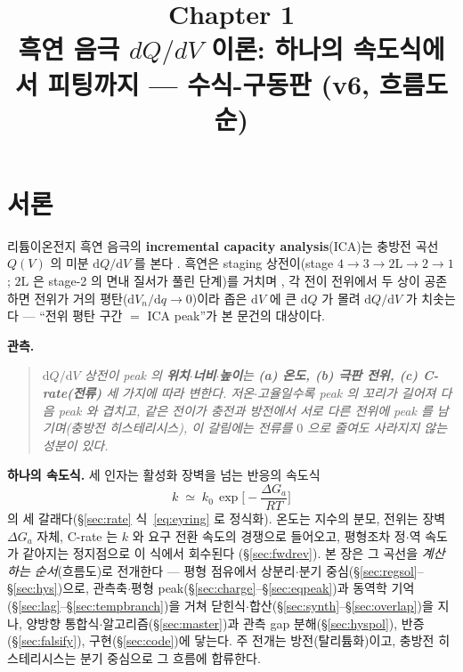 \documentclass[11pt,a4paper]{article}
\title{\textbf{\LARGE Chapter 1}\\[0.35em]\Large 흑연 음극 $dQ/dV$ 이론: 하나의 속도식에서 피팅까지 — 수식-구동판 (v6, 흐름도 순)}
\author{}
\date{}
\newcommand{\dd}{\mathrm{d}}
\begin{document}
\maketitle

\section*{서론}
리튬이온전지 흑연 음극의 \textbf{incremental capacity analysis}(ICA)는 충방전 곡선 $Q(V)$ 의 미분
$\dd Q/\dd V$ 를 본다 \cite{bloom2005,dubarry2012}. 흑연은 staging 상전이(stage
$4\!\to\!3\!\to\!2\mathrm L\!\to\!2\!\to\!1$; $2\mathrm L$ 은 stage-2 의 면내 질서가 풀린 단계)를 거치며
\cite{dahn1991,ohzuku1993,funabiki1999}, 각 전이 전위에서 두 상이 공존하면 전위가 거의 평탄($\dd V_n/\dd q\to0$)이라
좁은 $\dd V$ 에 큰 $\dd Q$ 가 몰려 $\dd Q/\dd V$ 가 치솟는다 — ``전위 평탄 구간 $=$ ICA peak''가 본 문건의 대상이다.

\textbf{관측.}
\begin{quote}\itshape
$\dd Q/\dd V$ 상전이 peak 의 \textbf{위치$\cdot$너비$\cdot$높이}는 \textbf{(a) 온도, (b) 극판 전위, (c) C-rate(전류)}
세 가지에 따라 변한다. 저온$\cdot$고율일수록 peak 의 꼬리가 길어져 다음 peak 와 겹치고, 같은 전이가 충전과 방전에서 서로 다른
전위에 peak 를 남기며(충방전 히스테리시스), 이 갈림에는 전류를 $0$ 으로 줄여도 사라지지 않는 성분이 있다.
\end{quote}

\textbf{하나의 속도식.} 세 인자는 활성화 장벽을 넘는 반응의 속도식
\begin{equation*}
k\;\simeq\;k_0\,\exp\!\Big[-\frac{\Delta G_a}{RT}\Big]
\end{equation*}
의 세 갈래다(\S\ref{sec:rate} 식~\eqref{eq:eyring} 로 정식화). 온도는 지수의 분모, 전위는 장벽 $\Delta G_a$ 자체,
C-rate 는 $k$ 와 요구 전환 속도의 경쟁으로 들어오고, 평형조차 정$\cdot$역 속도가 같아지는 정지점으로 이 식에서 회수된다
(\S\ref{sec:fwdrev}). 본 장은 그 곡선을 \emph{계산하는 순서}(흐름도)로 전개한다 — 평형 점유에서 상분리$\cdot$분기 중심(\S\ref{sec:regsol}--\S\ref{sec:hys})으로, 관측축$\cdot$평형 peak(\S\ref{sec:charge}--\S\ref{sec:eqpeak})과 동역학 기억(\S\ref{sec:lag}--\S\ref{sec:tempbranch})을 거쳐 닫힌식$\cdot$합산(\S\ref{sec:synth}--\S\ref{sec:overlap})을 지나, 양방향 통합식$\cdot$알고리즘(\S\ref{sec:master})과 관측 gap 분해(\S\ref{sec:hyspol}), 반증(\S\ref{sec:falsify}), 구현(\S\ref{sec:code})에 닿는다. 주 전개는 방전(탈리튬화)이고, 충방전 히스테리시스는 분기 중심으로 그 흐름에 합류한다.
\end{document}
